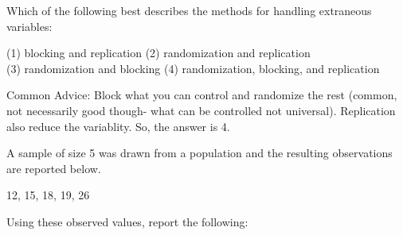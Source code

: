 \documentclass[addpoints]{examsetup}
\begin{document}



\examCoverPage

\begin{questions}


\question[2] 
 Which of the following best describes the methods for handling extraneous variables:

(1) blocking and replication \hspace{1cm}(2) randomization and
replication \\ (3) randomization and blocking \hspace{0.5cm}(4)
randomization, blocking, and replication\\
\begin{solution}
Common Advice: Block what you can control and randomize the rest (common, not necessarily good though- what can be controlled not universal). Replication also reduce the variablity. So, the answer is 4.
\end{solution}



% 

\vspace{1cm}

\question 


A sample of size 5 was drawn from a population and the resulting observations are reported below. 
\begin{center}
12, 15, 18, 19, 26
\end{center}
Using these observed values, report the following:
\vspace{1cm}

\end{questions}
\end{document}
